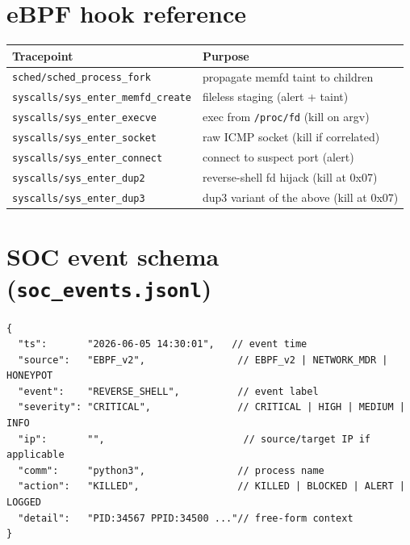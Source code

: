 \documentclass[11pt]{article}
\newcommand{\co}[1]{\texttt{#1}}
\begin{document}
\section{eBPF hook reference}
\begin{center}
\small
\begin{tabularx}{\linewidth}{@{}l Y@{}}
\toprule
\textbf{Tracepoint} & \textbf{Purpose}\\
\midrule
\co{sched/sched\_process\_fork} & propagate memfd taint to children\\
\co{syscalls/sys\_enter\_memfd\_create} & fileless staging (alert + taint)\\
\co{syscalls/sys\_enter\_execve} & exec from \co{/proc/fd} (kill on argv)\\
\co{syscalls/sys\_enter\_socket} & raw ICMP socket (kill if correlated)\\
\co{syscalls/sys\_enter\_connect} & connect to suspect port (alert)\\
\co{syscalls/sys\_enter\_dup2} & reverse-shell fd hijack (kill at 0x07)\\
\co{syscalls/sys\_enter\_dup3} & dup3 variant of the above (kill at 0x07)\\
\bottomrule
\end{tabularx}
\end{center}

\section{SOC event schema (\texttt{soc\_events.jsonl})}
\begin{lstlisting}
{
  "ts":       "2026-06-05 14:30:01",   // event time
  "source":   "EBPF_v2",                // EBPF_v2 | NETWORK_MDR | HONEYPOT
  "event":    "REVERSE_SHELL",          // event label
  "severity": "CRITICAL",               // CRITICAL | HIGH | MEDIUM | INFO
  "ip":       "",                        // source/target IP if applicable
  "comm":     "python3",                // process name
  "action":   "KILLED",                 // KILLED | BLOCKED | ALERT | LOGGED
  "detail":   "PID:34567 PPID:34500 ..."// free-form context
}
\end{lstlisting}
\end{document}

